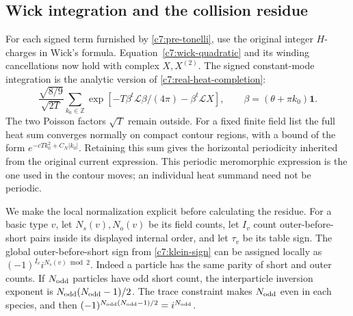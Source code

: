 \subsection{Wick integration and the collision residue}

For each signed term furnished by \eqref{c7:pre-tonelli}, use the original
integer $H$-charges in Wick's formula.  Equation~\eqref{c7:wick-quadratic}
and its winding cancellations now hold with complex $X,X^{(2)}$.
The signed constant-mode integration is the analytic version of
\eqref{c7:real-heat-completion}:
\begin{equation}\label{c7:signed-heat-completion}
\frac{\sqrt{8/9}}{\sqrt{2T}}\sum_{k_0\in\mathbb Z}
 \exp[-T\beta^t\mathcal L\beta/(4\pi)-\beta^t\mathcal L X],
\qquad \beta=(\theta+\pi k_0)\mathbf1.
\end{equation}
The two Poisson factors $\sqrt T$ remain outside.  For a fixed finite field
list the full heat sum converges normally on compact contour regions, with a
bound of the form $e^{-cTk_0^2+C_N|k_0|}$.  Retaining this sum gives the
horizontal periodicity inherited from the original current expression.
This periodic meromorphic expression is the one used in the contour moves;
an individual heat summand need not be periodic.

We make the local normalization explicit before calculating the residue.
For a basic type $v$, let $N_s(v),N_o(v)$ be its field counts, let $I_v$
count outer-before-short pairs inside its displayed internal order, and let
$\tau_v$ be its table sign.  The global outer-before-short sign from
\eqref{c7:klein-sign} can be assigned locally as
$(-1)^{I_v}i^{N_s(v)\bmod2}$.  Indeed a particle has the same parity of
short and outer counts.  If $N_{\rm odd}$ particles have odd short count, the
interparticle inversion exponent is $N_{\rm odd}(N_{\rm odd}-1)/2$.  The
trace constraint makes $N_{\rm odd}$ even in each species, and then
$(-1)^{N_{\rm odd}(N_{\rm odd}-1)/2}=i^{N_{\rm odd}}$.

